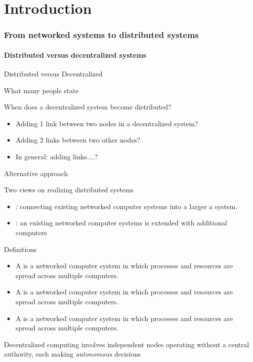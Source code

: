 \part{Introduction}
\section{From networked systems to distributed systems}
\subsection{Distributed versus decentralized systems}
\begin{slide}{Distributed versus Decentralized}
  \begin{block}{What many people state}
  \end{block}
  \begin{alertblock}{When does a decentralized system become distributed?}
    \begin{itemize}\tightlist
    \item Adding 1 link between two nodes in a decentralized system?
    \item Adding 2 links between two other nodes?
    \item In general: adding  links....? 
    \end{itemize}
  \end{alertblock}
\end{slide}
\begin{slide}{Alternative approach}
  \begin{block}{Two views on realizing distributed systems}
    \begin{itemize}
    \item {}: connecting existing networked computer systems into a larger a system.
    \item {}: an existing networked computer systems is extended with additional
      computers 
    \end{itemize}
  \end{block}
  \begin{block}{Definitions}
    \begin{itemize}
    \item A  is a networked computer system in which processes and resources are
       spread across multiple computers.
    \item A  is a networked computer system in which processes and resources are
       spread across multiple computers.
    \item A  is a networked computer system in which processes and resources are
       spread across multiple computers.
    \end{itemize}
    Decentralized computing involves independent nodes 
    operating without a central authority, each making 
    \emph{autonomous} decisions    
  \end{block}
\end{slide}
